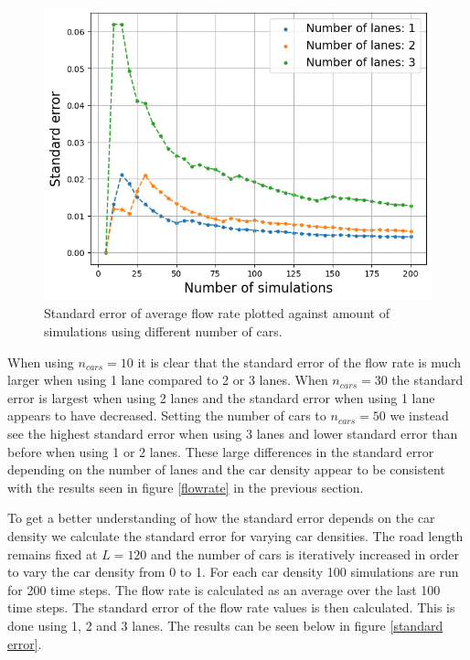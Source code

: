 \documentclass[a4paper,12pt]{article}
\begin{document}
\begin{figure}[H]
\begin{minipage}{.5\textwidth}
        \includegraphics[scale=0.47]{Images/standard error 50 cars 120.png}
    \end{minipage}%
    \caption{Standard error of average flow rate plotted against amount of simulations using different number of cars.}
    \label{standard error 1}
\end{figure}

When using $n_{cars}=10$ it is clear that the standard error of the flow rate is much larger when using 1 lane compared to 2 or 3 lanes.
When $n_{cars}=30$ the standard error is largest when using 2 lanes and the standard error when using 1 lane appears to have decreased.
Setting the number of cars to $n_{cars}=50$ we instead see the highest standard error when using 3 lanes and lower standard error than before 
when using 1 or 2 lanes. These large differences in the standard error depending on the number of lanes and the car density appear to 
be consistent with the results seen in figure \ref*{flowrate} in the previous section.

To get a better understanding of how the standard error depends on the car density we calculate the standard error for varying car densities.
The road length remains fixed at $L=120$ and the number of cars is iteratively increased in order to vary the car density from 0 to 1. For each car density 100 simulations are run
for 200 time steps. The flow rate is calculated as an average over the last 100 time steps. The standard error of the flow rate values is then calculated.
This is done using 1, 2 and 3 lanes. The results can be seen below in figure \ref*{standard error}.
\end{document}
